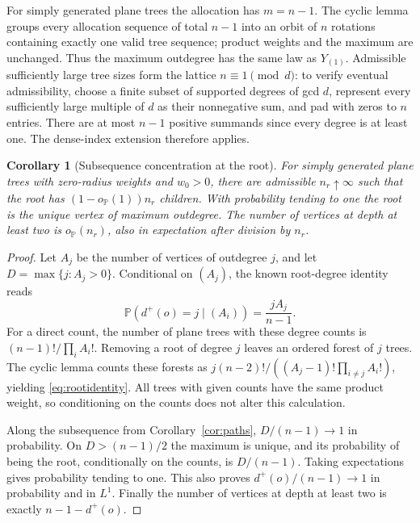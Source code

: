 \documentclass[11pt]{article}
\newtheorem{corollary}[theorem]{Corollary}
\theoremstyle{remark}\newtheorem{remark}[theorem]{Remark}
\newcommand{\Pp}{\mathbb P}
\begin{document}
For simply generated plane trees the allocation has $m=n-1$. The cyclic
lemma groups every allocation sequence of total $n-1$ into an orbit of
$n$ rotations containing exactly one valid tree sequence; product weights
and the maximum are unchanged. Thus the maximum outdegree has the same
law as $Y_{(1)}$. Admissible sufficiently large tree sizes form the lattice
$n\equiv1\pmod d$: to verify eventual admissibility, choose a finite subset
of supported degrees of gcd $d$, represent every sufficiently large
multiple of $d$ as their nonnegative sum, and pad with zeros to $n$ entries.
There are at most $n-1$ positive summands since every degree is at least one.
The dense-index extension therefore applies.

\begin{corollary}[Subsequence concentration at the root]\label{cor:root}
For simply generated plane trees with zero-radius weights and $w_0>0$,
there are admissible $n_r\uparrow\infty$ such that the root has
$(1-o_{\Pp}(1))n_r$ children. With probability tending to one the root is
the unique vertex of maximum outdegree. The number of vertices at depth
at least two is $o_{\Pp}(n_r)$, also in expectation after division by $n_r$.
\end{corollary}

\begin{proof}
Let $A_j$ be the number of vertices of outdegree $j$, and let
$D=\max\{j:A_j>0\}$. Conditional on $(A_j)$, the known root-degree identity
\cite[Lemma 14.7 and equation (19.1)]{Janson} reads
\begin{equation}\label{eq:rootidentity}
 \Pp(d^+(o)=j\mid(A_i))=\frac{jA_j}{n-1}.
\end{equation}
For a direct count, the number of plane trees with these degree counts is
$(n-1)!/\prod_iA_i!$. Removing a root of degree $j$ leaves an ordered forest
of $j$ trees. The cyclic lemma counts these forests as
$j(n-2)!/((A_j-1)!\prod_{i\ne j}A_i!)$, yielding
\eqref{eq:rootidentity}. All trees with given counts have the same product
weight, so conditioning on the counts does not alter this calculation.

Along the subsequence from Corollary~\ref{cor:paths}, $D/(n-1)\to1$ in
probability. On $D>(n-1)/2$ the maximum is unique, and its probability of
being the root, conditionally on the counts, is $D/(n-1)$. Taking
expectations gives probability tending to one. This also proves
$d^+(o)/(n-1)\to1$ in probability and in $L^1$. Finally the number of
vertices at depth at least two is exactly $n-1-d^+(o)$.
\end{proof}
\end{document}
